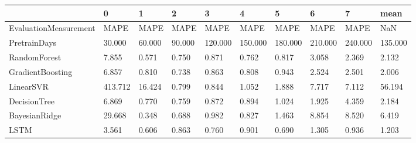 \begin{tabular}{llllllllll}
\toprule
{} &       0 &      1 &      2 &       3 &       4 &       5 &       6 &       7 &    mean \\
\midrule
EvaluationMeasurement &    MAPE &   MAPE &   MAPE &    MAPE &    MAPE &    MAPE &    MAPE &    MAPE &     NaN \\
PretrainDays          &  30.000 & 60.000 & 90.000 & 120.000 & 150.000 & 180.000 & 210.000 & 240.000 & 135.000 \\
RandomForest          &   7.855 &  0.571 &  0.750 &   0.871 &   0.762 &   0.817 &   3.058 &   2.369 &   2.132 \\
GradientBoosting      &   6.857 &  0.810 &  0.738 &   0.863 &   0.808 &   0.943 &   2.524 &   2.501 &   2.006 \\
LinearSVR             & 413.712 & 16.424 &  0.799 &   0.844 &   1.052 &   1.888 &   7.717 &   7.112 &  56.194 \\
DecisionTree          &   6.869 &  0.770 &  0.759 &   0.872 &   0.894 &   1.024 &   1.925 &   4.359 &   2.184 \\
BayesianRidge         &  29.668 &  0.348 &  0.688 &   0.982 &   0.827 &   1.463 &   8.854 &   8.520 &   6.419 \\
LSTM                  &   3.561 &  0.606 &  0.863 &   0.760 &   0.901 &   0.690 &   1.305 &   0.936 &   1.203 \\
\bottomrule
\end{tabular}
